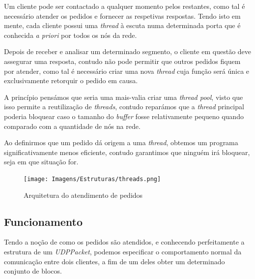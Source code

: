         Um cliente pode ser contactado a qualquer momento pelos restantes, como tal é necessário atender os pedidos e fornecer as respetivas respostas. Tendo isto em mente, cada cliente possui uma \textit{thread} à escuta numa determinada porta que é conhecida \textit{a priori} por todos os nós da rede.

        Depois de receber e analisar um determinado segmento, o cliente em questão deve assegurar uma resposta, contudo não pode permitir que outros pedidos fiquem por atender, como tal é necessário criar uma nova \textit{thread} cuja função será única e exclusivamente retorquir o pedido em causa.

        A princípio pensámos que seria uma mais-valia criar uma \textit{thread pool}, visto que isso permite a reutilização de \textit{threads}, contudo reparámos que a \textit{thread} principal poderia bloquear caso o tamanho do \textit{buffer} fosse relativamente pequeno quando comparado com a quantidade de nós na rede.

        Ao definirmos que um pedido dá origem a uma \textit{thread}, obtemos um programa significativamente menos eficiente, contudo garantimos que ninguém irá bloquear, seja em que situação for.

        \newpage
        \begin{figure}[hb!]
            \centering
            \texttt{[image: Imagens/Estruturas/threads.png]}
            \caption{Arquitetura do atendimento de pedidos}
        \end{figure}    

    \subsection{Funcionamento}

        Tendo a noção de como os pedidos são atendidos, e conhecendo perfeitamente a estrutura de um \textit{UDPPacket}, podemos especificar o comportamento normal da comunicação entre dois clientes, a fim de um deles obter um determinado conjunto de blocos.

